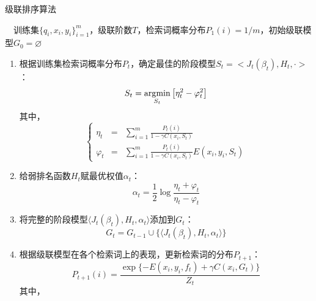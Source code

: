 \begin{algorithm}[htbp]
        \caption{级联排序算法}
        \begin{algorithmic}
            \REQUIRE ~~训练集$\{q_i,x_i,y_i\}^m_{i=1}$，级联阶数$T$，检索词概率分布$P_1(i)=1/m$，初始级联模型$G_0 =\varnothing$\\
            \STATE
            \begin{enumerate}
                \item 根据训练集检索词概率分布$P_t$，确定最佳的阶段模型$S_t = <J_t(\beta_t), H_t, \cdot>$：
                \begin{equation}
                    S_t = \operatorname*{\mathrm{\arg\!\min}}\limits_{S_t} \big[\eta_t^2 - \varphi_t^2\big]
                \end{equation}
                其中，%
                \begin{equation}
                    \left\{
                    \begin{array}{lll}
                      \eta_t & = & \sum\limits_{i=1}^m \frac{P_t(i)}{1-\gamma C(x_i,S_t)}\\
                      \varphi_t & = & \sum\limits_{i=1}^m \frac{P_t(i)}{1-\gamma C(x_i,S_t)} E(x_i,y_i,S_t)
                    \end{array}
                    \right.
                \end{equation}
                \item 给弱排名函数$H_t$赋最优权值$\alpha_t$：
                \begin{equation}
                    \alpha_t = \frac{1}{2} \log \frac{\eta_t + \varphi_t}{\eta_t - \varphi_t}
                \end{equation}
                \item 将完整的阶段模型$\langle J_t(\beta_t), H_t, \alpha_t\rangle$添加到$G_t$：
                \begin{equation}
                    G_t = G_{t-1} \cup \{\langle J_t(\beta_t), H_t, \alpha_t\rangle\}
                \end{equation}
                \item 根据级联模型在各个检索词上的表现，更新检索词的分布$P_{t+1}$：
                \begin{equation}
                    P_{t+1}(i)= \frac{\exp\{-E(x_i,y_i,f_t) + \gamma C(x_i,G_t)\}}{Z_t}
                \end{equation}
                其中，
                \begin{equation}

\end{equation}
\end{enumerate}
\end{algorithmic}
\end{algorithm}
